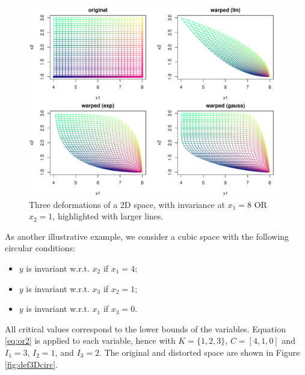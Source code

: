 \begin{figure}[!ht]
\centering
 \includegraphics[width=.8\textwidth]{def2DOR.pdf}
 \caption{Three deformations of a 2D space, with invariance at $x_1=8$ OR $x_2=1$, highlighted with larger lines.}\label{fig:def2DOR}
\end{figure}
% 
% 

As another illustrative example, we consider a cubic space with the following circular conditions:
\begin{itemize}
 \item $y$ is invariant w.r.t. $x_2$ if $x_1=4$;
 \item $y$ is invariant w.r.t. $x_3$ if $x_2=1$;
 \item $y$ is invariant w.r.t. $x_1$ if $x_3=0$.
\end{itemize}
All critical values correspond to the lower bounds of the variables.
Equation \ref{eq:or2} is applied to each variable, hence with $K=\{1,2,3\}$, $C=[4,1,0]$ and $I_1=3$, $I_2=1$, and $I_3=2$. 
The original and distorted space are shown in Figure \ref{fig:def3Dcirc}.

